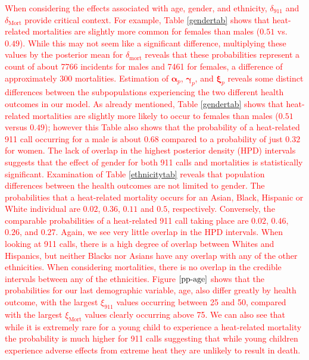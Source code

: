 \documentclass[final]{statsoc}
\begin{document}
\textcolor{red}{When considering the effects associated with age, gender, and ethnicity, $\delta_{911}$ and $\delta_{\text{Mort}}$ provide critical context. For example, Table \ref{gendertab} shows that heat-related mortalities are slightly more common for females than males ($0.51$ vs. $0.49$). While this may not seem like a significant difference, multiplying these values by the posterior mean for $\delta_{\text{mort}}$ reveals that these probabilities represent a count of about 7766 incidents for males and 7461 for females, a difference of approximately 300 mortalities. 
Estimation of $\boldsymbol\alpha_p$, $\boldsymbol\gamma_p$, and $\boldsymbol\xi_p$ reveals some distinct differences between the subpopulations experiencing the two different health outcomes in our model. As already mentioned, Table \ref{gendertab} shows that heat-related mortalities are slightly more likely to occur to females than males ($0.51$ versus $0.49$); however this Table also shows that the probability of a heat-related 911 call occurring for a male is about $0.68$ compared to a probability of just $0.32$ for women. The lack of overlap in the highest posterior density (HPD) intervals suggests that the effect of gender for both 911 calls and mortalities is statistically significant. Examination of Table \ref{ethnicitytab}
reveals that population differences between the health outcomes are not limited to gender. The probabilities that a heat-related mortality occurs for an Asian, Black, Hispanic or White individual are $0.02$, $0.36$, $0.11$ and $0.5$, respectively. Conversely, the comparable probabilities of a heat-related 911 call taking place are $0.02$, $0.46$, $0.26$, and $0.27$.  Again, we see very little overlap in the HPD intervals. When looking at 911 calls, there is a high degree of overlap between Whites and Hispanics, but neither Blacks nor Asians have any overlap with any of the other ethnicities. When considering mortalities, there is no overlap in the credible intervals between any of the ethnicities. Figure $\ref{pp-age}$ shows that the probabilities for our last demographic variable, age, also differ greatly by health outcome, with the largest $\xi_{911}$ values occurring between 25 and 50, compared with the largest $\xi_{\text{Mort}}$ values clearly occurring above 75. We can also see that while it is extremely rare for a young child to experience a heat-related mortality the probability is much higher for 911 calls suggesting that while young children experience adverse effects from extreme heat they are unlikely to result in death.}
\end{document}

